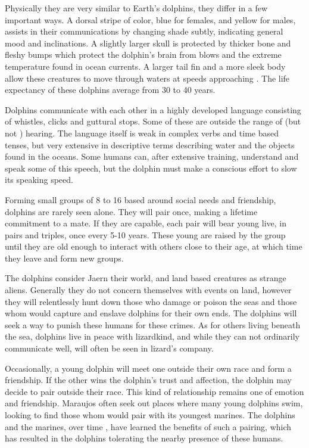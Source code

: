 \begin{multicols*}{2}
Physically they are very similar to Earth's dolphins, they differ in a few important ways. A dorsal stripe of color, blue for females, and yellow for males, assists in their communications by changing shade subtly, indicating general mood and inclinations. A slightly larger skull is protected by thicker bone and fleshy bumps which protect the dolphin's brain from blows and the extreme temperature found in ocean currents. A larger tail fin and a more sleek body allow these creatures to move through waters at speeds approaching . The life expectancy of these dolphins average from 30 to 40 years.

Dolphins communicate with each other in a highly developed language consisting of whistles, clicks and guttural stops. Some of these are outside the range of  (but not ) hearing. The language itself is weak in complex verbs and time based tenses, but very extensive in descriptive terms describing water and the objects found in the oceans. Some humans can, after extensive training, understand and speak some of this speech, but the dolphin must make a conscious effort to slow its speaking speed.

Forming small groups of 8 to 16 based around social needs and friendship, dolphins are rarely seen alone. They will pair once, making a lifetime commitment to a mate. If they are capable, each pair will bear young live, in pairs and triples, once every 5-10 years. These young are raised by the group until they are old enough to interact with others close to their age, at which time they leave and form new groups.

The dolphins consider Jaern their world, and land based creatures as strange aliens. Generally they do not concern themselves with events on land, however they will relentlessly hunt down those who damage or poison the seas and those whom would capture and enslave dolphins for their own ends. The dolphins will seek a way to punish these humans for these crimes. As for others living beneath the sea, dolphins live in peace with lizardkind, and while they can not ordinarily communicate well, will often be seen in lizard's company.

Occasionally, a young dolphin will meet one outside their own race and form a friendship. If the other wins the dolphin's trust and affection, the dolphin may decide to pair outside their race. This kind of relationship remains one of emotion and friendship. Maraujos often seek out places where many young dolphins swim, looking to find those whom would pair with its youngest marines. The dolphins and the marines, over time , have learned the benefits of such a pairing, which has resulted in the dolphins tolerating the nearby presence of these humans.


\end{multicols*}
